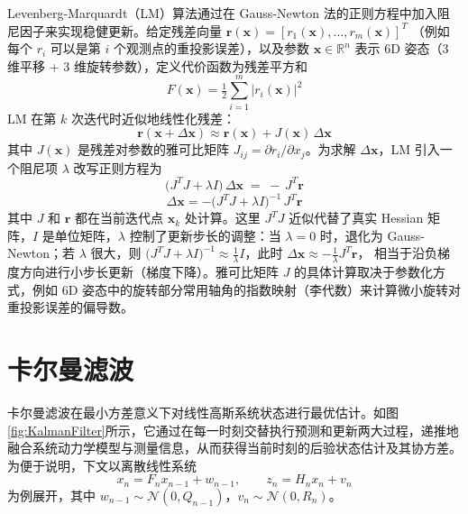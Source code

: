 Levenberg-Marquardt（LM）算法通过在 Gauss-Newton 法的正则方程中加入阻尼因子来实现稳健更新。给定残差向量 
\(\mathbf{r}(\mathbf{x}) = [r_1(\mathbf{x}), \dots, r_m(\mathbf{x})]^T\) 
（例如每个 \(r_i\) 可以是第 \(i\) 个观测点的重投影误差），以及参数 \(\mathbf{x}\in \mathbb{R}^n\) 表示 6D 姿态（3 维平移 + 3 维旋转参数），定义代价函数为残差平方和 
\begin{equation}
	F(\mathbf{x}) = \tfrac{1}{2}\sum_{i=1}^m \bigl\lvert r_i(\mathbf{x})\bigr\rvert^2
\end{equation}
LM 在第 \(k\) 次迭代时近似地线性化残差：
\begin{equation}
	\mathbf{r}(\mathbf{x}+\Delta \mathbf{x}) \approx \mathbf{r}(\mathbf{x}) + J(\mathbf{x}) \,\Delta \mathbf{x}
\end{equation}
其中 \(J(\mathbf{x})\) 是残差对参数的雅可比矩阵 \(J_{ij} = \partial r_i/\partial x_j\)。为求解 \(\Delta \mathbf{x}\)，LM 引入一个阻尼项 \(\lambda\) 改写正则方程为
\begin{equation}
	\bigl(J^T J + \lambda I\bigr)\,\Delta \mathbf{x} \;=\; -\,J^T \mathbf{r}
\end{equation}
\begin{equation}
	\Delta \mathbf{x} 
	= -\bigl(J^{T} J + \lambda I \bigr)^{-1} \, J^{T} \mathbf{r}
\end{equation}
其中 \(J\) 和 \(\mathbf{r}\) 都在当前迭代点 \(\mathbf{x}_k\) 处计算。这里 \(J^T J\) 近似代替了真实 Hessian 矩阵，\(I\) 是单位矩阵，\(\lambda\) 控制了更新步长的调整：当 \(\lambda=0\) 时，退化为 Gauss-Newton；若 \(\lambda\) 很大，则 \(\bigl(J^T J + \lambda I\bigr)^{-1} \approx \tfrac{1}{\lambda}I\)，此时 
\(\Delta \mathbf{x} \approx -\tfrac{1}{\lambda} J^T \mathbf{r}\)，
相当于沿负梯度方向进行小步长更新（梯度下降）。雅可比矩阵 \(J\) 的具体计算取决于参数化方式，例如 6D 姿态中的旋转部分常用轴角的指数映射（李代数）来计算微小旋转对重投影误差的偏导数。

\section{卡尔曼滤波}

卡尔曼滤波在最小方差意义下对线性高斯系统状态进行最优估计\cite{kalman1960new}。如图\ref{fig:KalmanFilter}所示，它通过在每一时刻交替执行预测和更新两大过程，递推地融合系统动力学模型与测量信息，从而获得当前时刻的后验状态估计及其协方差。为便于说明，下文以离散线性系统  
\begin{equation}
	x_n = F_n x_{n-1} + w_{n-1},\qquad
	z_n = H_n x_n + v_n
\end{equation}
为例展开，其中 \(w_{n-1}\sim\mathcal N(0,Q_{n-1})\)，\(v_n\sim\mathcal N(0,R_n)\)。

